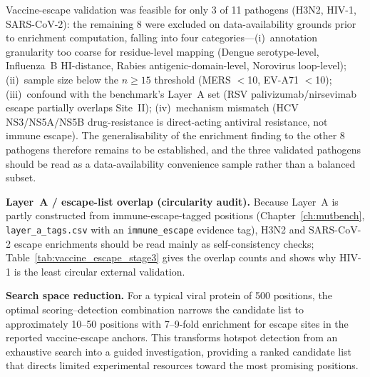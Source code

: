 Vaccine-escape validation was feasible for only 3 of 11 pathogens (H3N2, HIV-1, SARS-CoV-2)\label{tab:escape_availability}: the remaining 8 were excluded on data-availability grounds prior to enrichment computation, falling into four categories---(i)~annotation granularity too coarse for residue-level mapping (Dengue serotype-level, Influenza~B HI-distance, Rabies antigenic-domain-level, Norovirus loop-level); (ii)~sample size below the $n \geq 15$ threshold (MERS $<$10, EV-A71 $<$10); (iii)~confound with the benchmark's Layer~A set (RSV palivizumab/nirsevimab escape partially overlaps Site~II); (iv)~mechanism mismatch (HCV NS3/NS5A/NS5B drug-resistance is direct-acting antiviral resistance, not immune escape). The generalisability of the enrichment finding to the other 8 pathogens therefore remains to be established, and the three validated pathogens should be read as a data-availability convenience sample rather than a balanced subset.

\textbf{Layer~A / escape-list overlap (circularity audit).}
Because Layer~A is partly constructed from immune-escape-tagged positions (Chapter~\ref{ch:mutbench}, \texttt{layer\_a\_tags.csv} with an \texttt{immune\_escape} evidence tag), H3N2 and SARS-CoV-2 escape enrichments should be read mainly as self-consistency checks; Table~\ref{tab:vaccine_escape_stage3} gives the overlap counts and shows why HIV-1 is the least circular external validation.

\textbf{Search space reduction.}
For a typical viral protein of 500 positions, the optimal scoring--detection combination narrows the candidate list to approximately 10--50 positions with 7--9-fold enrichment for escape sites in the reported vaccine-escape anchors. This transforms hotspot detection from an exhaustive search into a guided investigation, providing a ranked candidate list that directs limited experimental resources toward the most promising positions.

